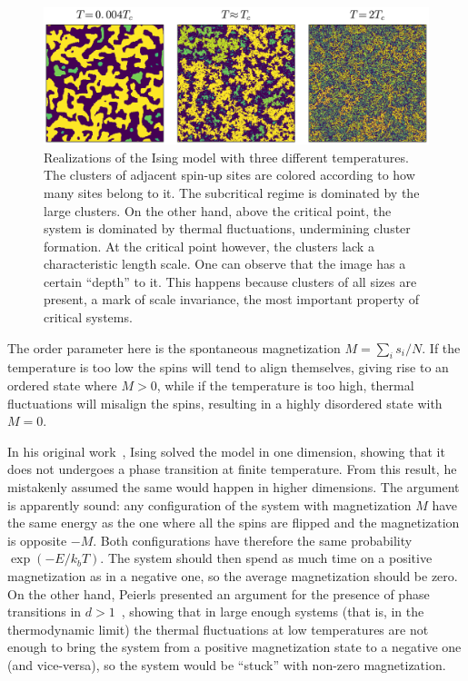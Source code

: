 \begin{figure}[b]
\begin{center}
    \includegraphics[width=\textwidth]{chapters/ch2-crit/figs/ising}
\end{center}
\caption{Realizations of the Ising model with three different
    temperatures. The clusters of adjacent spin-up sites are colored according
    to how many sites belong to it. The subcritical regime is dominated by the
    large clusters. On the other hand, above the critical point, the system is
    dominated by thermal fluctuations, undermining cluster formation. At the
    critical point however, the clusters lack a characteristic length scale.
    One can observe that the image has a certain ``depth'' to it. This happens
    because clusters of all sizes are present, a mark of scale invariance,
    the most important property of critical systems.}
\label{fig:ising}
\end{figure}


The order parameter here is the spontaneous magnetization $M=\sum_i s_i / N$.
If the temperature is too low the spins will tend to align themselves, giving
rise to an ordered state where $M>0$, while if the temperature is too high,
thermal fluctuations will misalign the spins, resulting in a highly disordered
state with $M=0$.

In his original work~\cite{Ising1925}, Ising solved the model in one dimension,
showing that it does not undergoes a phase transition at finite temperature.
From this result, he mistakenly assumed the same would happen in higher
dimensions. The argument is apparently sound: any configuration of the system
with magnetization $M$ have the same energy as the one where all the spins are
flipped and the magnetization is opposite $-M$. Both configurations have
therefore the same probability $\exp(-E/k_b T)$. The system should then spend
as much time on a positive magnetization as in a negative one, so the average
magnetization should be zero.
On the other hand, Peierls presented an argument for the presence of phase
transitions in $d>1$~\cite{Peierls1936}, showing that in large enough systems
(that is, in the thermodynamic limit) the thermal fluctuations at low
temperatures are not enough to bring the system from a positive magnetization
state to a negative one (and vice-versa), so the system would be ``stuck''
with non-zero magnetization.

